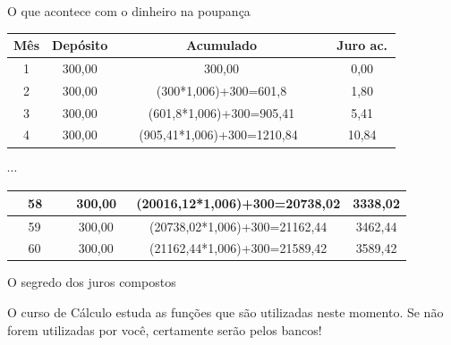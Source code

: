 \documentclass[]{beamer}
\begin{document}
\begin{frame}{O que acontece com o dinheiro na poupança}

\begin{center}
\begin{tabular}{|c|c|c|c|}
\hline 
Mês & Depósito & Acumulado & Juro ac.\tabularnewline
\hline 
\hline 
1 & 300,00 & 300,00 & 0,00\tabularnewline
\hline 
2 & 300,00 & (300{*}1,006)+300=601,8 & 1,80\tabularnewline
\hline 
3 & 300,00 & (601,8{*}1,006)+300=905,41 & 5,41\tabularnewline
\hline 
4 & 300,00 & ~~~(905,41{*}1,006)+300=1210,84~~~~ & ~~10,84~~\tabularnewline
\hline 
\end{tabular}
\par\end{center}

\begin{center}
$\cdots$
\par\end{center}

\begin{center}
\begin{tabular}{|c|c|c|c|}
\hline 
~~58~ & ~~300,00~ & (20016,12{*}1,006)+300=20738,02 & 3338,02\tabularnewline
\hline 
~~59~ & ~~300,00~ & (20738,02{*}1,006)+300=21162,44 & 3462,44\tabularnewline
\hline 
~~60~ & ~~300,00~ & (21162,44{*}1,006)+300=21589,42 & 3589,42\tabularnewline
\hline 
\end{tabular}
\par\end{center}

\end{frame}


\begin{frame}{O segredo dos juros compostos}


\large {O curso de Cálculo estuda as funções que são utilizadas neste momento.
Se não forem utilizadas por você, certamente serão pelos bancos!}

\end{frame}
\end{document}
